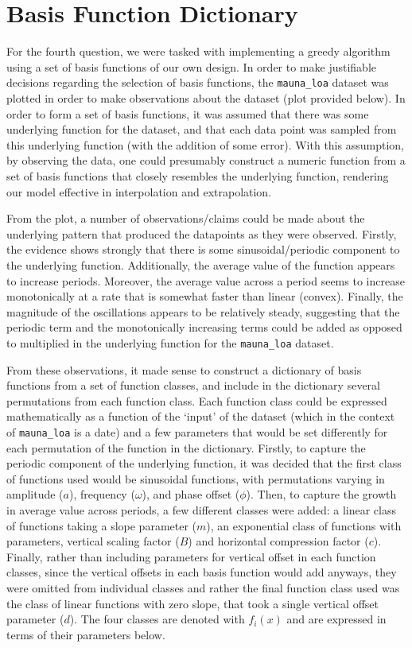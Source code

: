 \documentclass{article}
\begin{document}
\pagebreak
\fi
\section{Basis Function Dictionary}
For the fourth question, we were tasked with implementing a greedy algorithm using a set of basis functions of our own design. In order to make justifiable decisions regarding the selection of basis functions, the \verb+mauna_loa+ dataset was plotted in order to make observations about the dataset (plot provided below). In order to form a set of basis functions, it was assumed that there was some underlying function for the dataset, and that each data point was sampled from this underlying function (with the addition of some error). With this assumption, by observing the data, one could presumably construct a numeric function from a set of basis functions that closely resembles the underlying function, rendering our model effective in interpolation and extrapolation.


From the plot, a number of observations/claims could be made about the underlying pattern that produced the datapoints as they were observed. Firstly, the evidence shows strongly that there is some sinusoidal/periodic component to the underlying function. Additionally, the average value of the function appears to increase periods. Moreover, the average value across a period seems to increase monotonically at a rate that is somewhat faster than linear (convex). Finally, the magnitude of the oscillations appears to be relatively steady, suggesting that the periodic term and the monotonically increasing terms could be added as opposed to multiplied in the underlying function for the \verb+mauna_loa+ dataset.

From these observations, it made sense to construct a dictionary of basis functions from a set of function classes, and include in the dictionary several permutations from each function class. Each function class could be expressed mathematically as a function of the `input' of the dataset (which in the context of \verb+mauna_loa+ is a date) and a few parameters that would be set differently for each permutation of the function in the dictionary. Firstly, to capture the periodic component of the underlying function, it was decided that the first class of functions used would be sinusoidal functions, with permutations varying in amplitude ($a$), frequency ($\omega$), and phase offset ($\phi$). Then, to capture the growth in average value across periods, a few different classes were added: a linear class of functions taking a slope parameter ($m$), an exponential class of functions with parameters, vertical scaling factor ($B$) and horizontal compression factor ($c$).
Finally, rather than including parameters for vertical offset in each function classes, since the vertical offsets in each basis function would add anyways, they were omitted from individual classes and rather the final function class used was the class of linear functions with zero slope, that took a single vertical offset parameter ($d$). The four classes are denoted with $f_i(x)$ and are expressed in terms of their parameters below.
\end{document}
